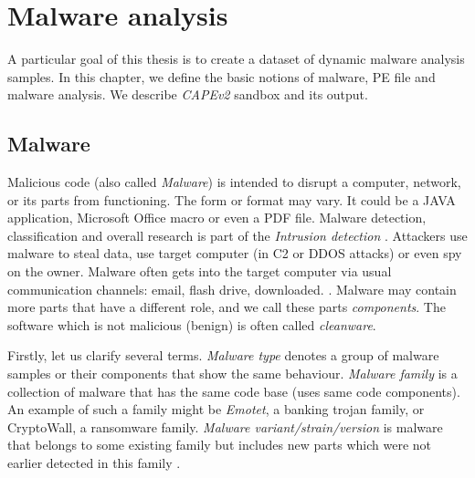 \chapter{Malware analysis} \label{chap:analysis}
A particular goal of this thesis is to create a dataset of dynamic malware analysis samples. In this chapter, we define the basic notions of malware, PE file and malware analysis. We describe \emph{CAPEv2} sandbox and its output. 

\section{Malware}
Malicious code (also called \emph{Malware}) is intended to disrupt a computer, network, or its parts from functioning. The form or format may vary. It could be a JAVA application, Microsoft Office macro or even a PDF file. Malware detection, classification and overall research is part of the \emph{Intrusion detection} \cite{Cole2009}. Attackers use malware to steal data, use target computer (in C2 or DDOS attacks) or even spy on the owner. Malware often gets into the target computer via usual communication channels: email, flash drive, downloaded. \cite{KA2018}. Malware may contain more parts that have a different role, and we call these parts \emph{components}. The software which is not malicious (benign) is often called \emph{cleanware}.

Firstly, let us clarify several terms. \emph{Malware type} denotes a group of malware samples or their components that show the same behaviour. \emph{Malware family} is a collection of malware that has the same code base (uses same code components). An example of such a family might be \emph{Emotet}, a banking trojan family, or CryptoWall, a ransomware family. \emph{Malware variant/strain/version} is malware that belongs to some existing family but includes new parts which were not earlier detected in this family \cite{Cohen2019}.

